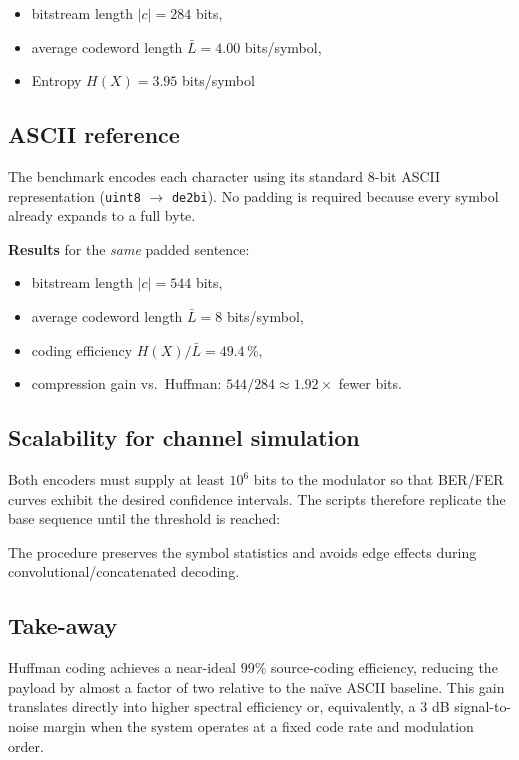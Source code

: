 \begin{itemize}
  \item bitstream length $\lvert c\rvert = 284$ bits,
  \item average codeword length $\bar L = 4.00$ bits/symbol,
  \item Entropy $H(X)=3.95$ bits/symbol
\end{itemize}


\subsection{ASCII reference}
\label{ssec:ascii}

The benchmark encodes each character using its standard 8-bit ASCII
representation (\lstinline|uint8| $\rightarrow$ \lstinline|de2bi|).  No padding
is required because every symbol already expands to a full byte.

\vspace{0.5em}
\noindent
\textbf{Results} for the \emph{same} padded sentence:
\begin{itemize}
  \item bitstream length $\lvert c\rvert = 544$ bits,
  \item average codeword length $\bar L = 8$ bits/symbol,
  \item coding efficiency $H(X)/\bar L = 49.4\,\%$,
  \item compression gain vs.\ Huffman: $544/284 \approx 1.92\times$ fewer bits.
\end{itemize}


\subsection{Scalability for channel simulation}

Both encoders must supply at least $10^6$ bits to the modulator so that
\textsc{BER}/\textsc{FER} curves exhibit the desired confidence
intervals.  The scripts therefore replicate the base sequence until the
threshold is reached:

The procedure preserves the symbol statistics and avoids edge effects
during convolutional/concatenated decoding.

\subsection{Take-away} 
Huffman coding achieves a near-ideal $99\%$ source-coding efficiency,
reducing the payload by almost a factor of two relative to the naïve
ASCII baseline.  This gain translates directly into higher spectral
efficiency or, equivalently, a $3$ dB signal-to-noise margin when the
system operates at a fixed code rate and modulation order.